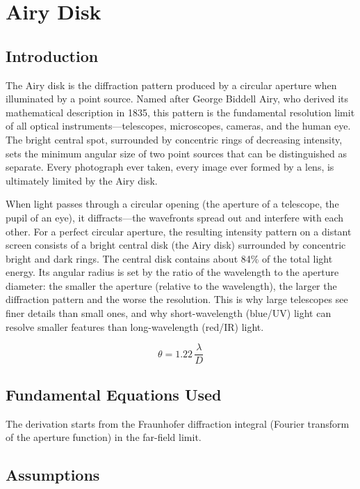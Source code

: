 \chapter{Airy Disk}

\section*{Introduction}

The Airy disk is the diffraction pattern produced by a circular aperture when illuminated by a point source. Named after George Biddell Airy, who derived its mathematical description in 1835, this pattern is the fundamental resolution limit of all optical instruments---telescopes, microscopes, cameras, and the human eye. The bright central spot, surrounded by concentric rings of decreasing intensity, sets the minimum angular size of two point sources that can be distinguished as separate. Every photograph ever taken, every image ever formed by a lens, is ultimately limited by the Airy disk.

When light passes through a circular opening (the aperture of a telescope, the pupil of an eye), it diffracts---the wavefronts spread out and interfere with each other. For a perfect circular aperture, the resulting intensity pattern on a distant screen consists of a bright central disk (the Airy disk) surrounded by concentric bright and dark rings. The central disk contains about 84\% of the total light energy. Its angular radius is set by the ratio of the wavelength to the aperture diameter: the smaller the aperture (relative to the wavelength), the larger the diffraction pattern and the worse the resolution. This is why large telescopes see finer details than small ones, and why short-wavelength (blue/UV) light can resolve smaller features than long-wavelength (red/IR) light.


\begin{equation}
\theta = 1.22\,\frac{\lambda}{D}
\end{equation}

\section*{Fundamental Equations Used}

The derivation starts from the Fraunhofer diffraction integral (Fourier transform of the aperture function) in the far-field limit.

\section*{Assumptions}

